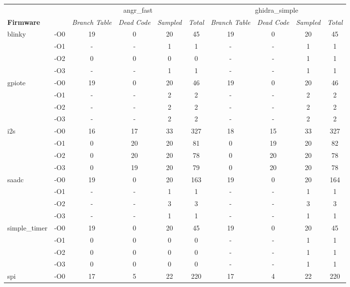 \begin{tabular}{@{}ll|cccc|cccc@{}}
\toprule
    & & \multicolumn{4}{c}{angr\_fast} & \multicolumn{4}{c}{ghidra\_simple} \\
\multicolumn{2}{l}{\textbf{Firmware}} & \textit{Branch Table} & \textit{Dead Code} & \textit{Sampled} & \textit{Total} & \textit{Branch Table} & \textit{Dead Code} & \textit{Sampled} & \textit{Total} \\ \midrule
\multirow{4}{*}{blinky}
    & -O0 & 19 &  0 & 20 &  45 & 19 &  0 & 20 &  45  \\
    & -O1 &  - &  - &  1 &   1 &  - &  - &  1 &   1  \\
    & -O2 &  0 &  0 &  0 &   0 &  - &  - &  1 &   1  \\
    & -O3 &  - &  - &  1 &   1 &  - &  - &  1 &   1  \\ \midrule
\multirow{4}{*}{gpiote}
    & -O0 & 19 &  0 & 20 &  46 & 19 &  0 & 20 &  46  \\
    & -O1 &  - &  - &  2 &   2 &  - &  - &  2 &   2  \\
    & -O2 &  - &  - &  2 &   2 &  - &  - &  2 &   2  \\
    & -O3 &  - &  - &  2 &   2 &  - &  - &  2 &   2  \\ \midrule
\multirow{4}{*}{i2s}
    & -O0 & 16 & 17 & 33 & 327 & 18 & 15 & 33 & 327  \\
    & -O1 &  0 & 20 & 20 &  81 &  0 & 19 & 20 &  82  \\
    & -O2 &  0 & 20 & 20 &  78 &  0 & 20 & 20 &  78  \\
    & -O3 &  0 & 19 & 20 &  79 &  0 & 20 & 20 &  78  \\ \midrule
\multirow{4}{*}{saadc}
    & -O0 & 19 &  0 & 20 & 163 & 19 &  0 & 20 & 164  \\
    & -O1 &  - &  - &  1 &   1 &  - &  - &  1 &   1  \\
    & -O2 &  - &  - &  3 &   3 &  - &  - &  3 &   3  \\
    & -O3 &  - &  - &  1 &   1 &  - &  - &  1 &   1  \\ \midrule
\multirow{4}{*}{simple\_timer}
    & -O0 & 19 &  0 & 20 &  45 & 19 &  0 & 20 &  45  \\
    & -O1 &  0 &  0 &  0 &   0 &  - &  - &  1 &   1  \\
    & -O2 &  0 &  0 &  0 &   0 &  - &  - &  1 &   1  \\
    & -O3 &  0 &  0 &  0 &   0 &  - &  - &  1 &   1  \\ \midrule
\multirow{4}{*}{spi}
    & -O0 & 17 &  5 & 22 & 220 & 17 &  4 & 22 & 220  \\

\end{tabular}
